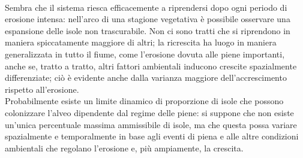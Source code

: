 \\
Sembra che il sistema riesca efficacemente a riprendersi dopo ogni periodo di erosione intensa: nell'arco di una stagione vegetativa è possibile osservare una espansione delle isole non trascurabile.
Non ci sono tratti che si riprendono in maniera spiccatamente maggiore di altri; la ricrescita ha luogo in maniera generalizzata in tutto il fiume, come l'erosione dovuta alle piene importanti, anche se, tratto a tratto, altri fattori ambientali inducono crescite spazialmente differenziate; ciò è evidente anche dalla varianza maggiore dell'accrescimento rispetto all'erosione.
\\
Probabilmente esiste un limite dinamico di proporzione di isole che possono colonizzare l'alveo dipendente dal regime delle piene: si suppone che non esiste un'unica percentuale massima ammissibile di isole, ma che questa possa variare spazialmente e temporalmente in base agli eventi di piena e alle altre condizioni ambientali che regolano l'erosione e, più ampiamente, la crescita.

